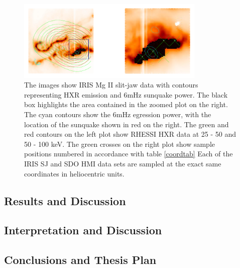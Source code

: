 \begin{figure}[H]
  \begin{center}
  \includegraphics[width=0.8\textwidth]{29-Mar-14-MGII-Sunquake-Context-Plots-xx-Zoom-crop}
  \end{center}
  \caption{The images show IRIS Mg II slit-jaw data with contours representing HXR emission and 6mHz sunquake power. The black box highlights the area contained in the zoomed plot on the right. The cyan contours show the 6mHz egression power, with the location of the sunquake shown in red on the right. The green and red contours on the left plot show RHESSI HXR data at 25 - 50 and 50 - 100 keV. The green crosses on the right plot show sample positions numbered in accordance with table \ref{coordtab} Each of the IRIS SJ and SDO HMI data sets are sampled at the exact same coordinates in heliocentric units.}\label{mgrib}
\end{figure}


\subsection{Results and Discussion}
\subsection{Interpretation and Discussion}
\subsection{Conclusions and Thesis Plan}



